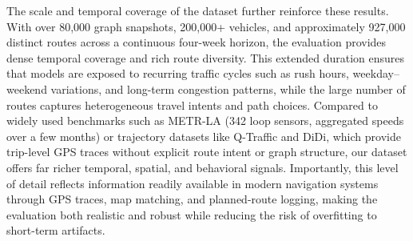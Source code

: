 The scale and temporal coverage of the dataset further reinforce these results. With over 80,000 graph snapshots, 200,000+ vehicles, and approximately 927,000 distinct routes across a continuous four-week horizon, the evaluation provides dense temporal coverage and rich route diversity. This extended duration ensures that models are exposed to recurring traffic cycles such as rush hours, weekday–weekend variations, and long-term congestion patterns, while the large number of routes captures heterogeneous travel intents and path choices. Compared to widely used benchmarks such as METR-LA (342 loop sensors, aggregated speeds over a few months) or trajectory datasets like Q-Traffic and DiDi, which provide trip-level GPS traces without explicit route intent or graph structure, our dataset offers far richer temporal, spatial, and behavioral signals. Importantly, this level of detail reflects information readily available in modern navigation systems through GPS traces, map matching, and planned-route logging, making the evaluation both realistic and robust while reducing the risk of overfitting to short-term artifacts.
